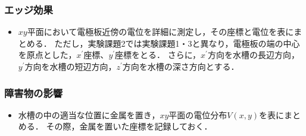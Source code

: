 \subsubsection{エッジ効果}
\begin{itemize}
    \item $xy$平面において電極板近傍の電位を詳細に測定し，その座標と電位を表にまとめる．
    ただし，実験課題2では実験課題1・3と異なり，電極板の端の中心を原点とした，$x^\prime$座標、$y^\prime$座標をとる．
    さらに，$x^\prime$方向を水槽の長辺方向，$y^\prime$方向を水槽の短辺方向，$z^\prime$方向を水槽の深さ方向とする．
\end{itemize}

\subsubsection{障害物の影響}
\begin{itemize}
    \item 水槽の中の適当な位置に金属を置き，$xy$平面の電位分布$V(x,y)$を表にまとめる．
    その際，金属を置いた座標を記録しておく．
\end{itemize}
